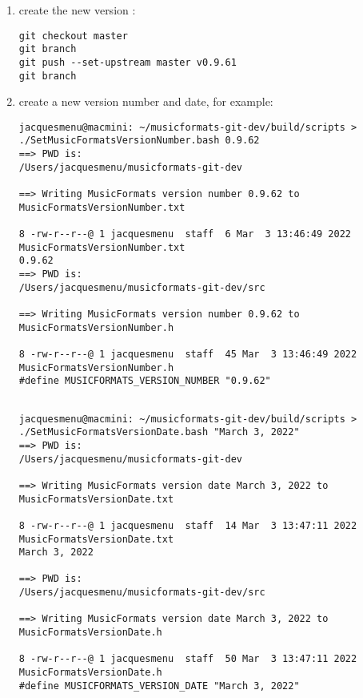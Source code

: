 \begin{enumerate}
\item create the new version \branch:
\begin{lstlisting}[language=Terminal]
git checkout master
git branch
git push --set-upstream master v0.9.61
git branch
\end{lstlisting}

\item create a new version number and date, for example:
\begin{lstlisting}[language=Terminal]
jacquesmenu@macmini: ~/musicformats-git-dev/build/scripts > ./SetMusicFormatsVersionNumber.bash 0.9.62
==> PWD is:
/Users/jacquesmenu/musicformats-git-dev

==> Writing MusicFormats version number 0.9.62 to MusicFormatsVersionNumber.txt

8 -rw-r--r--@ 1 jacquesmenu  staff  6 Mar  3 13:46:49 2022 MusicFormatsVersionNumber.txt
0.9.62
==> PWD is:
/Users/jacquesmenu/musicformats-git-dev/src

==> Writing MusicFormats version number 0.9.62 to MusicFormatsVersionNumber.h

8 -rw-r--r--@ 1 jacquesmenu  staff  45 Mar  3 13:46:49 2022 MusicFormatsVersionNumber.h
#define MUSICFORMATS_VERSION_NUMBER "0.9.62"
\end{lstlisting}

\begin{lstlisting}[language=Terminal]

jacquesmenu@macmini: ~/musicformats-git-dev/build/scripts > ./SetMusicFormatsVersionDate.bash "March 3, 2022"
==> PWD is:
/Users/jacquesmenu/musicformats-git-dev

==> Writing MusicFormats version date March 3, 2022 to MusicFormatsVersionDate.txt

8 -rw-r--r--@ 1 jacquesmenu  staff  14 Mar  3 13:47:11 2022 MusicFormatsVersionDate.txt
March 3, 2022

==> PWD is:
/Users/jacquesmenu/musicformats-git-dev/src

==> Writing MusicFormats version date March 3, 2022 to MusicFormatsVersionDate.h

8 -rw-r--r--@ 1 jacquesmenu  staff  50 Mar  3 13:47:11 2022 MusicFormatsVersionDate.h
#define MUSICFORMATS_VERSION_DATE "March 3, 2022"
\end{lstlisting}

\end{enumerate}
